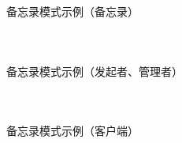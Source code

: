 \documentclass[UTF8,aspectratio=169]{beamer}
\begin{document}
\begin{frame}{备忘录模式示例（备忘录）}
    \begin{columns}
        \begin{column}{0.48\textwidth}
            \inputminted[firstline=1, lastline=15]{cpp}{code/memento_pattern.cpp}
        \end{column}
        \begin{column}{0.48\textwidth}
            \inputminted[firstline=17, lastline=30]{cpp}{code/memento_pattern.cpp}
        \end{column}
    \end{columns}
\end{frame}

\begin{frame}{备忘录模式示例（发起者、管理者）}
    \begin{columns}
        \begin{column}{0.48\textwidth}
            \inputminted[firstline=17, lastline=30]{cpp}{code/memento_pattern.cpp}
        \end{column}
        \begin{column}{0.48\textwidth}
            \inputminted[firstline=32, lastline=46]{cpp}{code/memento_pattern.cpp}
        \end{column}
    \end{columns}
\end{frame}

\begin{frame}{备忘录模式示例（客户端）}
    \begin{columns}
        \begin{column}{0.48\textwidth}
            \inputminted[firstline=54, lastline=70]{cpp}{code/memento_pattern.cpp}
        \end{column}
        \begin{column}{0.48\textwidth}
            \inputminted[firstline=72, lastline=84]{cpp}{code/memento_pattern.cpp}
        \end{column}
    \end{columns}
\end{frame}
\end{document}
